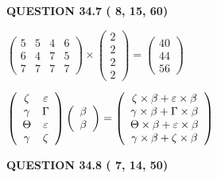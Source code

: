 \documentclass[12pt]{article}
\begin{document}
{\textbf{\Large{QUESTION
34.7 
 (          8,         15,         60)
}}}
  
  
 
 
\noindent{}

 
$\left( \begin{array}{ccccccccccccccc}
           5 & 
           5 & 
           4 & 
           6 \\ 
           6 & 
           4 & 
           7 & 
           5 \\ 
           7 & 
           7 & 
           7 & 
           7
\end{array}\right) \times
\left( \begin{array}{c}
           2 \\ 
           2 \\ 
           2 \\ 
           2
\end{array}\right)  =
\left( \begin{array}{c}
          40 \\ 
          44 \\ 
          56
\end{array}\right)  $
 
$  %
 \left( \begin{array}
 {
 c
 c
 }
                    \zeta & 
 \varepsilon \\ 
 \gamma & 
 \Gamma \\ 
 \Theta & 
 \varepsilon \\ 
 \gamma & 
                    \zeta
 \end{array} \right)
 \left( \begin{array}
 {
 c
 }
 \beta \\ 
 \beta
 \end{array} \right)
=
  \left( \begin{array}
 {
 c
 }
                    \zeta \times  \beta   +  \varepsilon \times  \beta \\ 
 \gamma \times  \beta   +  \Gamma \times  \beta \\ 
 \Theta \times  \beta   +  \varepsilon \times  \beta \\ 
 \gamma \times  \beta   +                     \zeta \times  \beta
 \end{array} \right)
$
 
 
 
  
\vspace{0.2in}
  
{\textbf{\Large{QUESTION
34.8 
 (          7,         14,         50)
}}}
  
\end{document}
